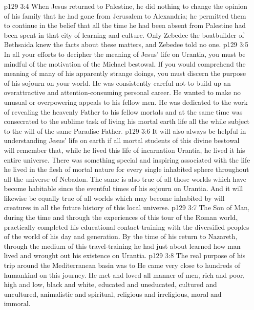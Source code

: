 \vs p129 3:4 When Jesus returned to Palestine, he did nothing to change the opinion of his family that he had gone from Jerusalem to Alexandria; he permitted them to continue in the belief that all the time he had been absent from Palestine had been spent in that city of learning and culture. Only Zebedee the boatbuilder of Bethsaida knew the facts about these matters, and Zebedee told no one.
\vs p129 3:5 \pc In all your efforts to decipher the meaning of Jesus’ life on Urantia, you must be mindful of the motivation of the Michael bestowal. If you would comprehend the meaning of many of his apparently strange doings, you must discern the purpose of his sojourn on your world. He was consistently careful not to build up an overattractive and attention\hyp{}consuming personal career. He wanted to make no unusual or overpowering appeals to his fellow men. He was dedicated to the work of revealing the heavenly Father to his fellow mortals and at the same time was consecrated to the sublime task of living his mortal earth life all the while subject to the will of the same Paradise Father.
\vs p129 3:6 \pc It will also always be helpful in understanding Jesus’ life on earth if all mortal students of this divine bestowal will remember that, while he lived this life of incarnation  Urantia, he lived it  his entire universe. There was something special and inspiring associated with the life he lived in the flesh of mortal nature for every single inhabited sphere throughout all the universe of Nebadon. The same is also true of all those worlds which have become habitable since the eventful times of his sojourn on Urantia. And it will likewise be equally true of all worlds which may become inhabited by will creatures in all the future history of this local universe.
\vs p129 3:7 \pc The Son of Man, during the time and through the experiences of this tour of the Roman world, practically completed his educational contact\hyp{}training with the diversified peoples of the world of his day and generation. By the time of his return to Nazareth, through the medium of this travel\hyp{}training he had just about learned how man lived and wrought out his existence on Urantia.
\vs p129 3:8 The real purpose of his trip around the Mediterranean basin was to  He came very close to hundreds of humankind on this journey. He met and loved all manner of men, rich and poor, high and low, black and white, educated and uneducated, cultured and uncultured, animalistic and spiritual, religious and irreligious, moral and immoral.
